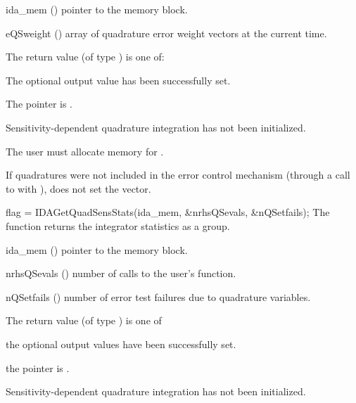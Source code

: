 {
  \begin{args}[eQSweight]
  \item[ida\_mem] ()
    pointer to the {\idas} memory block.
  \item[eQSweight] ()
    array of quadrature error weight vectors at the current time.
  \end{args}
}
{
  The return value  (of type ) is one of:
  \begin{args}
  \item[\Id{IDA\_SUCCESS}] 
    The optional output value has been successfully set.
  \item[\Id{IDA\_MEM\_NULL}]
    The  pointer is .
  \item[\Id{IDA\_NO\_QUADSENS}]
    Sensitivity-dependent quadrature integration has not been initialized.
  \end{args}
}
{
  {\warn}The user must allocate memory for .

  If quadratures were not included in the error control mechanism (through a 
  call to  with ), 
   does not set the  vector.
}
{
  flag = IDAGetQuadSensStats(ida\_mem, \&nrhsQSevals, \&nQSetfails);
}
{
  The function  returns the {\idas} integrator statistics
  as a group.
}
{
  \begin{args}[nrhsQSevals]
  \item[ida\_mem] ()
    pointer to the {\idas} memory block.
  \item[nrhsQSevals] ()
    number of calls to the user's  function.
  \item[nQSetfails] ()
    number of error test failures due to quadrature variables.
  \end{args}
}
{
  The return value  (of type ) is one of
  \begin{args}
  \item[\Id{IDA\_SUCCESS}] 
    the optional output values have been successfully set.
  \item[\Id{IDA\_MEM\_NULL}]
    the  pointer is .
  \item[\Id{IDA\_NO\_QUADSENS}]
    Sensitivity-dependent quadrature integration has not been initialized.
  \end{args}
}
{}

